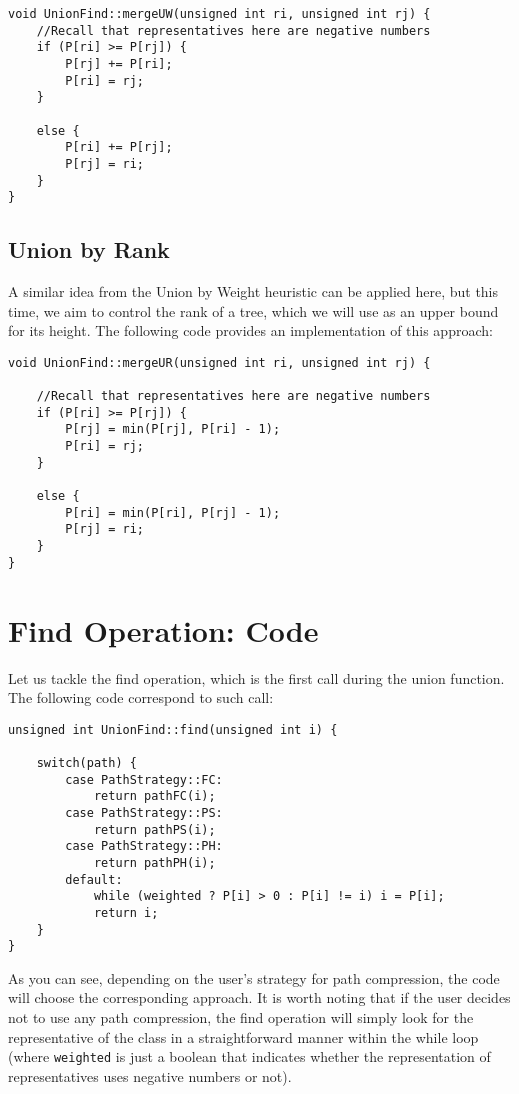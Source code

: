 \begin{verbatim}
void UnionFind::mergeUW(unsigned int ri, unsigned int rj) {
    //Recall that representatives here are negative numbers
    if (P[ri] >= P[rj]) {
        P[rj] += P[ri];
        P[ri] = rj;
    }

    else {
        P[ri] += P[rj];
        P[rj] = ri;
    }
}
\end{verbatim}

\subsection{Union by Rank}
A similar idea from the Union by Weight heuristic can be applied here, but this time, we aim to control the rank of a tree, which we will use as an upper bound for its height. The following code provides an implementation of this approach:

\begin{verbatim}
void UnionFind::mergeUR(unsigned int ri, unsigned int rj) {

    //Recall that representatives here are negative numbers
    if (P[ri] >= P[rj]) {
        P[rj] = min(P[rj], P[ri] - 1);
        P[ri] = rj;
    }

    else {
        P[ri] = min(P[ri], P[rj] - 1);
        P[rj] = ri;
    }
}
\end{verbatim}

\section{Find Operation: Code}\label{ap:Path}
Let us tackle the find operation, which is the first call during the union function. The following code correspond to such call: 

\begin{verbatim}
unsigned int UnionFind::find(unsigned int i) {

    switch(path) {
        case PathStrategy::FC:
            return pathFC(i);
        case PathStrategy::PS:
            return pathPS(i);
        case PathStrategy::PH:
            return pathPH(i);
        default:
            while (weighted ? P[i] > 0 : P[i] != i) i = P[i];
            return i;
    }
}

\end{verbatim}

As you can see, depending on the user's strategy for path compression, the code will choose the corresponding approach. It is worth noting that if the user decides not to use any path compression, the find operation will simply look for the representative of the class in a straightforward manner within the while loop (where \texttt{weighted} is just a boolean that indicates whether the representation of representatives uses negative numbers or not).


